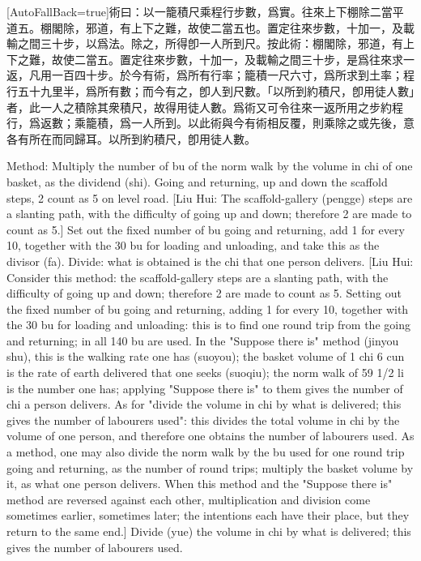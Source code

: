 \documentclass[11pt]{article}
\newcommand{\zhsmall}{\footnotesize\color{black!70}}
\newcommand{\unitlabel}[1]{\marginpar{\raggedleft\tiny\color{gray}#1}}
\newenvironment{unitzh}{\par\CJKfontspec{Noto Serif CJK SC}[AutoFallBack=true]\large\linespread{1.25}\selectfont}{\par}
\newenvironment{uniten}{\par\small\color{black!85}}{\par\medskip}
\begin{document}
\begin{unitzh}\unitlabel{jiuzhang-020.14}術曰：以一籠積尺乘程行步數，爲實。往來上下棚除二當平道五。{\zhsmall 棚閣除，邪道，有上下之難，故使二當五也。}置定往來步數，十加一，及載輸之間三十步，以爲法。除之，所得卽一人所到尺。{\zhsmall 按此術：棚閣除，邪道，有上下之難，故使二當五。置定往來步數，十加一，及載輸之間三十步，是爲往來求一返，凡用一百四十步。於今有術，爲所有行率；籠積一尺六寸，爲所求到土率；程行五十九里半，爲所有數；而今有之，卽人到尺數。「以所到約積尺，卽用徒人數」者，此一人之積除其衆積尺，故得用徒人數。爲術又可令往來一返所用之步約程行，爲返數；乘籠積，爲一人所到。以此術與今有術相反覆，則乘除之或先後，意各有所在而同歸耳。}以所到約積尺，卽用徒人數。\end{unitzh}
\begin{uniten}Method: Multiply the number of bu of the norm walk by the volume in chi of one basket, as the dividend (shi). Going and returning, up and down the scaffold steps, 2 count as 5 on level road. [Liu Hui: The scaffold-gallery (pengge) steps are a slanting path, with the difficulty of going up and down; therefore 2 are made to count as 5.] Set out the fixed number of bu going and returning, add 1 for every 10, together with the 30 bu for loading and unloading, and take this as the divisor (fa). Divide: what is obtained is the chi that one person delivers. [Liu Hui: Consider this method: the scaffold-gallery steps are a slanting path, with the difficulty of going up and down; therefore 2 are made to count as 5. Setting out the fixed number of bu going and returning, adding 1 for every 10, together with the 30 bu for loading and unloading: this is to find one round trip from the going and returning; in all 140 bu are used. In the "Suppose there is" method (jinyou shu), this is the walking rate one has (suoyou); the basket volume of 1 chi 6 cun is the rate of earth delivered that one seeks (suoqiu); the norm walk of 59 1/2 li is the number one has; applying "Suppose there is" to them gives the number of chi a person delivers. As for "divide the volume in chi by what is delivered; this gives the number of labourers used": this divides the total volume in chi by the volume of one person, and therefore one obtains the number of labourers used. As a method, one may also divide the norm walk by the bu used for one round trip going and returning, as the number of round trips; multiply the basket volume by it, as what one person delivers. When this method and the "Suppose there is" method are reversed against each other, multiplication and division come sometimes earlier, sometimes later; the intentions each have their place, but they return to the same end.] Divide (yue) the volume in chi by what is delivered; this gives the number of labourers used.\end{uniten}
\end{document}
